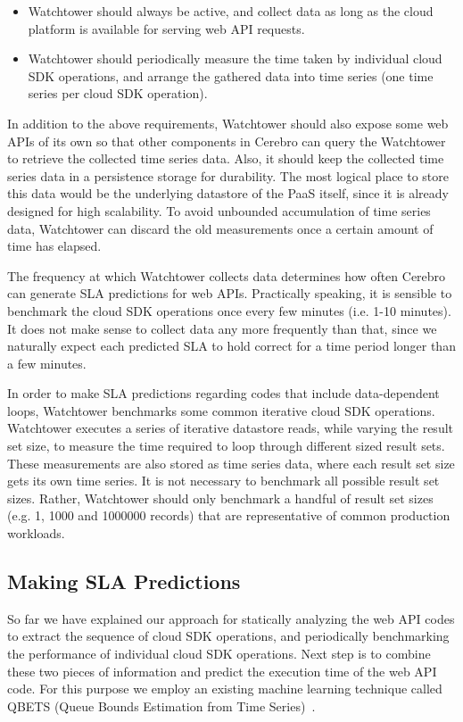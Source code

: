 \begin{itemize}
\item Watchtower should always be active, and collect data as long as the cloud platform is available for serving web API requests.
\item Watchtower should periodically measure the time taken by individual cloud SDK operations, and arrange the gathered data into time series (one time series per cloud SDK operation).
\end{itemize}

In addition to the above requirements, Watchtower should also expose some web APIs of its own 
so that other components in Cerebro can query the Watchtower to retrieve the collected time series data. Also,
it should keep the collected time series data in a persistence storage for durability. The most logical
place to store this data would be the underlying datastore of the PaaS itself, since it is already designed
for high scalability. To avoid unbounded accumulation of time series data, Watchtower can discard the old
measurements once a certain amount of time has elapsed. 

The frequency at which
Watchtower collects data determines how often Cerebro can generate SLA predictions for web APIs. Practically
speaking, it is sensible to benchmark the cloud SDK operations once every few minutes (i.e. 1-10 minutes). It does not make
sense to collect data any more frequently than that, since we naturally expect each predicted SLA to 
hold correct for a time period longer than a few minutes.

In order to make SLA predictions regarding codes that include data-dependent loops, Watchtower
benchmarks some common iterative cloud SDK operations. 
Watchtower executes a series of iterative datastore reads,
while varying the result set size, to measure the time required to loop through different sized result sets. These
measurements are also stored as time series data, where each result set size gets its own time series. 
It is not necessary to benchmark all possible result set sizes. Rather, Watchtower should only benchmark a
handful of result set sizes  (e.g. 1, 1000 and 1000000 records) that are representative of common 
production workloads.

\subsection{Making SLA Predictions}
So far we have explained our approach for statically analyzing the web API codes to extract the sequence
of cloud SDK operations, and periodically benchmarking the performance of individual cloud SDK
operations. Next step is to combine these two pieces of information and predict the execution time of the
web API code. For this purpose we employ an existing machine learning technique called
QBETS (Queue Bounds Estimation from Time Series)~\cite{Nurmi:2007:QQB:1791551.1791556}. 

